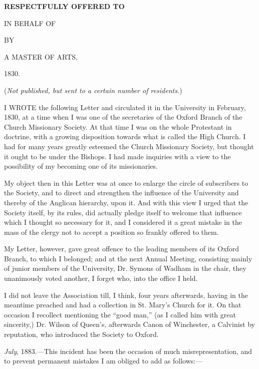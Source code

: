 
\textbf{RESPECTFULLY
OFFERED TO}


IN
BEHALF OF


BY

A
MASTER OF
ARTS,

1830.

(\emph{Not
published, but sent to a certain number of residents.})

I WROTE
the following Letter and circulated it in the University in February,
1830, at a time when I was one of the secretaries of the Oxford Branch
of the Church Missionary Society. At that time I was on the whole
Protestant in doctrine, with a growing disposition towards what is
called the High Church. I had for many years greatly esteemed the
Church Missionary Society, but thought it ought to be under the
Bishops. I had made inquiries with a view to the possibility of my
becoming one of its missionaries.

My object then in this Letter was at once to
enlarge the circle of subscribers to the Society, and to direct and
strengthen the influence of the University and thereby of the Anglican
hierarchy, upon it. And with this view I urged that the Society
itself, by its rules, did actually pledge itself to welcome that
influence which I thought so necessary for it, and I considered it a
great mistake in the mass of the clergy not to accept a position so
frankly offered to them.

My Letter, however, gave great offence to the
leading members of its Oxford Branch, to which I belonged; and at the
next Annual Meeting, consisting mainly of junior members of the
University, Dr. Symons of Wadham in the chair, they unanimously voted
another, I forget who, into the office I held.

I did not leave the Association till, I think,
four years afterwards, having in the meantime preached and had a
collection in St. Mary's Church for it. On that occasion I recollect
mentioning the ``good man,'' (as I called him with great sincerity,) Dr.
Wilson of Queen's, afterwards Canon of Winchester, a Calvinist by
reputation, who introduced the Society to Oxford.

\emph{July}, 1883.—This incident has been the
occasion of much misrepresentation, and to prevent permanent mistakes
I am obliged to add as follows:—

